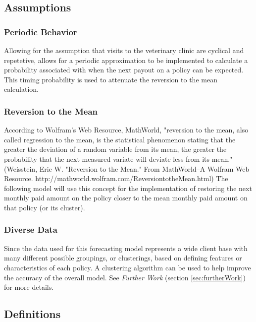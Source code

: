 \documentclass[12pt,letterpaper,titlepage]{article}
\begin{document}
		\subsection{Assumptions} \label{sec:assumptions}
			
			\subsubsection*{Periodic Behavior}
			Allowing for the assumption that visits to the veterinary clinic are cyclical and repetetive, allows for a periodic approximation to be implemented to calculate a probability associated with when the next payout on a policy can be expected. This timing probability is used to attenuate the reversion to the mean calculation. 
		
			\subsubsection*{Reversion to the Mean}
				According to Wolfram's Web Resource, MathWorld, "reversion to the mean, also called regression to the mean, is the statistical phenomenon stating that the greater the deviation of a random variable from its mean, the greater the probability that the next measured variate will deviate less from its mean." (Weisstein, Eric W. "Reversion to the Mean." From MathWorld--A Wolfram Web Resource. http://mathworld.wolfram.com/ReversiontotheMean.html) The following model will use this concept for the implementation of restoring the next monthly paid amount on the policy closer to the mean monthly paid amount on that policy (or its cluster).
				
			\subsubsection*{Diverse Data}
			Since the data used for this forecasting model represents a wide client base with many different possible groupings, or clusterings, based on defining features or characteristics of each policy. A clustering algorithm can be used to help improve the accuracy of the overall model. See \emph{Further Work} (section \ref{sec:furtherWork}) for more details.
		
		\subsection{Definitions}
\end{document}
